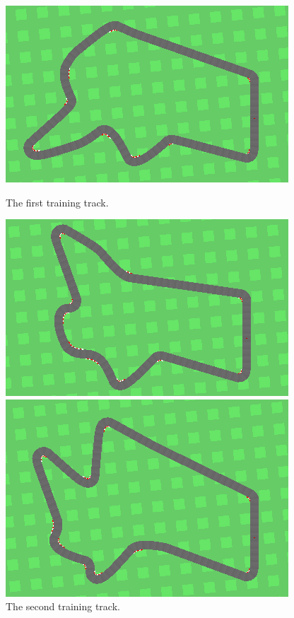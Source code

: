 \documentclass{article}
\begin{document}
\begin{figure}[!h]
\captionsetup{justification=centering}
\centering
\begin{minipage}[t]{.3\textwidth}
  \centering
  \includegraphics[width=\linewidth]{Graphics/track104.png}
  \caption{The first training track.}
\end{minipage}
\begin{minipage}[t]{.3\textwidth}
  \centering
  \includegraphics[width=\linewidth]{Graphics/track106.png}
  \caption{The second training track.}
\end{minipage}
\begin{minipage}[t]{.3\textwidth}
  \centering
  \includegraphics[width=\linewidth]{Graphics/track108.png}

\end{minipage}
\end{figure}
\end{document}
